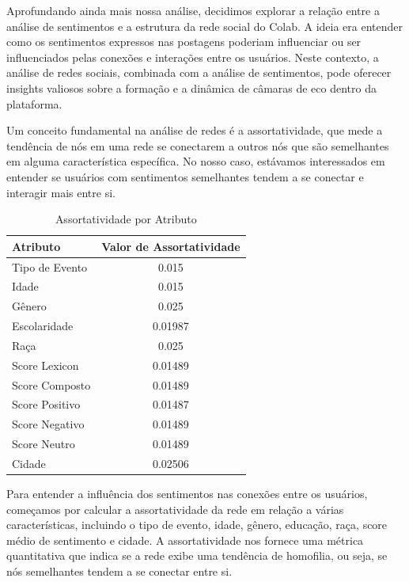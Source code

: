 Aprofundando ainda mais nossa análise, decidimos explorar a relação entre a análise de sentimentos e a estrutura da rede social do Colab. A ideia era entender como os sentimentos expressos nas postagens poderiam influenciar ou ser influenciados pelas conexões e interações entre os usuários. Neste contexto, a análise de redes sociais, combinada com a análise de sentimentos, pode oferecer insights valiosos sobre a formação e a dinâmica de câmaras de eco dentro da plataforma.

Um conceito fundamental na análise de redes é a assortatividade, que mede a tendência de nós em uma rede se conectarem a outros nós que são semelhantes em alguma característica específica. No nosso caso, estávamos interessados em entender se usuários com sentimentos semelhantes tendem a se conectar e interagir mais entre si.

\begin{table}[h]
	\centering
	\begin{tabular}{|l|c|}
		\hline
		\textbf{Atributo} & \textbf{Valor de Assortatividade} \\
		\hline
		Tipo de Evento    & 0.015                             \\
		\hline
		Idade             & 0.015                             \\
		\hline
		Gênero            & 0.025                             \\
		\hline
		Escolaridade      & 0.01987                           \\
		\hline
		Raça              & 0.025                             \\
		\hline
		Score Lexicon     & 0.01489                           \\
		\hline
		Score Composto    & 0.01489                           \\
		\hline
		Score Positivo    & 0.01487                           \\
		\hline
		Score Negativo    & 0.01489                           \\
		\hline
		Score Neutro      & 0.01489                           \\
		\hline
		Cidade            & 0.02506                           \\
		\hline
	\end{tabular}
	\caption{Assortatividade por Atributo}
\end{table}

Para entender a influência dos sentimentos nas conexões entre os usuários, começamos por calcular a assortatividade da rede em relação a várias características, incluindo o tipo de evento, idade, gênero, educação, raça, score médio de sentimento e cidade. A assortatividade nos fornece uma métrica quantitativa que indica se a rede exibe uma tendência de homofilia, ou seja, se nós semelhantes tendem a se conectar entre si.

